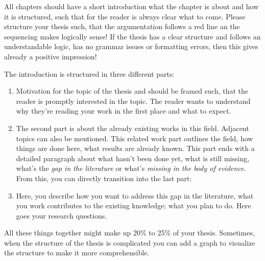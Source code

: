All chapters should have a short introduction what the chapter is about and how it is structured, such that for the reader is always clear what to come. Please structure your thesis such, that the argumentation follows a red line an the sequencing makes logically sense! If the thesis has a clear structure and follows an understandable logic, has no grammar issues or formatting errors, then this gives already a positive impression! 

The introduction is structured in three different parts:

\begin{enumerate}
    \item Motivation for the topic of the thesis and should be framed such, that the reader is promptly interested in the topic. The reader wants to understand why they're reading your work in the first place and what to expect.
    \item The second part is about the already existing works in this field. Adjacent topics can also be mentioned. This related work part outlines the field, how things are done here, what results are already known. This part ends with a detailed paragraph about what hasn't been done yet, what is still missing, what's the \textit{gap in the literature} or what's \textit{missing in the body of evidence}. From this, you can directly transition into the last part:
    \item Here, you describe how you want to address this gap in the literature, what you work contributes to the existing knowledge; what you plan to do. Here goes your research questions.
\end{enumerate}

All these things together might make up 20\% to 25\% of your thesis.
Sometimes, when the structure of the thesis is complicated you can add a graph to visualize the structure to make it more comprehensible. 

